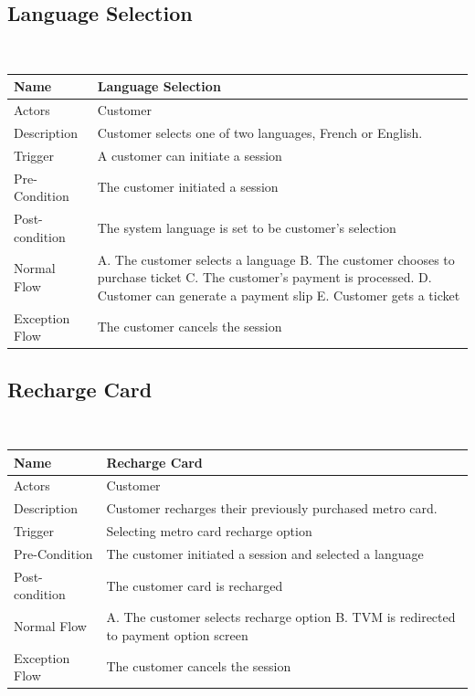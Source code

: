 \documentclass{article}
\begin{document}
{\subsection{Language Selection}
\hskip1cm\
\begin{tabular}{|p{3cm}|p{6cm}|}
    \hline
    Name & Language Selection\\
    \hline
    Actors & Customer\\
    \hline
    Description & Customer selects one of two languages, French or English.\\
    \hline
    Trigger & A customer can initiate a session\\
    \hline
    Pre-Condition & The customer initiated a session\\
    \hline
    Post-condition & The system language is set to be customer’s selection\\
    \hline
    Normal Flow &
        A. The customer selects a language \newline
        B. The customer chooses to purchase ticket\newline
        C. The customer’s payment is processed.\newline
        D. Customer can generate a payment slip\newline
        E. Customer gets a ticket\\
    \hline
    Exception Flow & The customer cancels the session\\
    \hline
\end{tabular}
\subsection{Recharge Card}
\hskip1cm\
\begin{tabular}{|p{3cm}|p{6cm}|}
    \hline
    Name & Recharge Card\\
    \hline
    Actors & Customer\\
    \hline
    Description & Customer recharges their previously purchased metro card.\\
    \hline
    Trigger & Selecting metro card recharge option\\
    \hline
    Pre-Condition & The customer initiated a session and selected a language\\
    \hline
    Post-condition & The customer card is recharged\\
    \hline
    Normal Flow &
        A. The customer selects recharge option\newline
        B. TVM is redirected to payment option screen\\
    \hline
    Exception Flow & The customer cancels the session\\
    \hline
\end{tabular}

}
\end{document}
